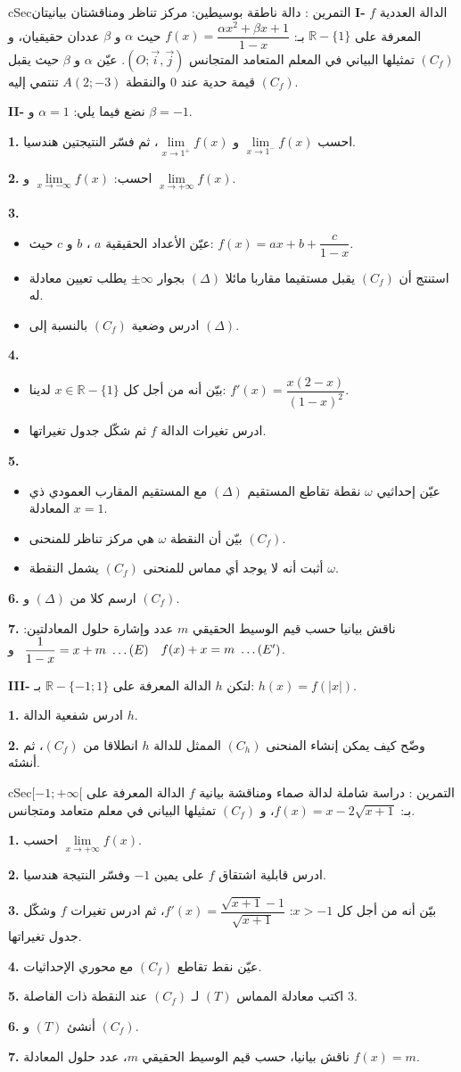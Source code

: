 \documentclass[12pt,a4paper]{article}
\newenvironment{BOX}[2]{\begin{otherlanguage}{english}\begin{arbox}{#1}{#2}}{\end{arbox}\end{otherlanguage}}
\newcounter{exo}
\newenvironment{tamrin}[1]{\stepcounter{exo}\begin{BOX}{cSec}{التمرين \theexo: #1}}{\end{BOX}}
\renewcommand{\ldots}{\mathinner{\ldotp\ldotp\ldotp}}
\newcommand{\R}{\mathbb{R}}
\newenvironment{sq}{\begin{itemize}[leftmargin=2.4em,itemsep=3pt]}{\end{itemize}}
\newcommand{\qa}{\item[(أ)]}\newcommand{\qb}{\item[(ب)]}\newcommand{\qc}{\item[(جـ)]}\newcommand{\qd}{\item[(د)]}\newcommand{\qe}{\item[(هـ)]}
\newcommand{\QQ}[1]{\par\smallskip\textbf{#1.} }
\begin{document}
\begin{tamrin}{دالة ناطقة بوسيطين: مركز تناظر ومناقشتان بيانيتان}
\textbf{I-} $f$ الدالة العددية المعرفة على $\R-\{1\}$ بـ: $f(x)=\dfrac{\alpha x^{2}+\beta x+1}{1-x}$ حيث $\alpha$ و $\beta$ عددان حقيقيان، و $(C_f)$ تمثيلها البياني في المعلم المتعامد المتجانس $\left(O;\vec{i},\vec{j}\right)$.
عيّن $\alpha$ و $\beta$ حيث يقبل $(C_f)$ قيمة حدية عند $0$ والنقطة $A(2;-3)$ تنتمي إليه.

\textbf{II-} نضع فيما يلي: $\alpha=1$ و $\beta=-1$.
\QQ{1} احسب $\lim\limits_{x\to1^{-}}f(x)$ و $\lim\limits_{x\to1^{+}}f(x)$، ثم فسّر النتيجتين هندسيا.
\QQ{2} احسب: $\lim\limits_{x\to-\infty}f(x)$ و $\lim\limits_{x\to+\infty}f(x)$.
\QQ{3}
\begin{sq}
\qa عيّن الأعداد الحقيقية $a$ ، $b$ و $c$ حيث: $f(x)=ax+b+\dfrac{c}{1-x}$.
\qb استنتج أن $(C_f)$ يقبل مستقيما مقاربا مائلا $(\Delta)$ بجوار $\pm\infty$ يطلب تعيين معادلة له.
\qc ادرس وضعية $(C_f)$ بالنسبة إلى $(\Delta)$.
\end{sq}
\QQ{4}
\begin{sq}
\qa بيّن أنه من أجل كل $x\in\R-\{1\}$ لدينا: $f'(x)=\dfrac{x(2-x)}{(1-x)^{2}}$.
\qb ادرس تغيرات الدالة $f$ ثم شكّل جدول تغيراتها.
\end{sq}
\QQ{5}
\begin{sq}
\qa عيّن إحداثيي $\omega$ نقطة تقاطع المستقيم $(\Delta)$ مع المستقيم المقارب العمودي ذي المعادلة $x=1$.
\qb بيّن أن النقطة $\omega$ هي مركز تناظر للمنحنى $(C_f)$.
\qc أثبت أنه لا يوجد أي مماس للمنحنى $(C_f)$ يشمل النقطة $\omega$.
\end{sq}
\QQ{6} ارسم كلا من $(\Delta)$ و $(C_f)$.
\QQ{7} ناقش بيانيا حسب قيم الوسيط الحقيقي $m$ عدد وإشارة حلول المعادلتين: $\dfrac{1}{1-x}=x+m\ \ldots(E)$ \ و \ $f(x)+x=m\ \ldots(E')$.

\textbf{III-} لتكن $h$ الدالة المعرفة على $\R-\{-1;1\}$ بـ: $h(x)=f(|x|)$.
\QQ{1} ادرس شفعية الدالة $h$.
\QQ{2} وضّح كيف يمكن إنشاء المنحنى $(C_h)$ الممثل للدالة $h$ انطلاقا من $(C_f)$، ثم أنشئه.
\end{tamrin}

\begin{tamrin}{دراسة شاملة لدالة صماء ومناقشة بيانية}
$f$ الدالة المعرفة على $[-1;+\infty[$ بـ: $f(x)=x-2\sqrt{x+1}$، و $(C_f)$ تمثيلها البياني في معلم متعامد ومتجانس.
\QQ{1} احسب $\lim\limits_{x\to+\infty}f(x)$.
\QQ{2} ادرس قابلية اشتقاق $f$ على يمين $-1$ وفسّر النتيجة هندسيا.
\QQ{3} بيّن أنه من أجل كل $x>-1$: $f'(x)=\dfrac{\sqrt{x+1}-1}{\sqrt{x+1}}$، ثم ادرس تغيرات $f$ وشكّل جدول تغيراتها.
\QQ{4} عيّن نقط تقاطع $(C_f)$ مع محوري الإحداثيات.
\QQ{5} اكتب معادلة المماس $(T)$ لـ $(C_f)$ عند النقطة ذات الفاصلة $3$.
\QQ{6} أنشئ $(T)$ و $(C_f)$.
\QQ{7} ناقش بيانيا، حسب قيم الوسيط الحقيقي $m$، عدد حلول المعادلة $f(x)=m$.
\end{tamrin}
\end{document}
